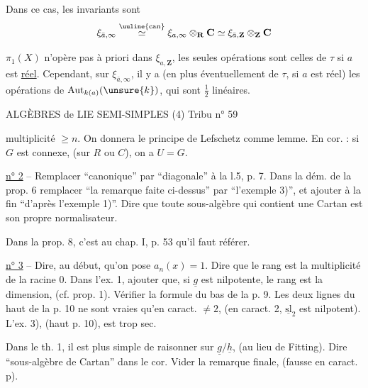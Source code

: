 Dans ce cas, les invariants sont
\[
\xi_{\bar a,\infty}\overset{\text{\uuline{can}}}{\simeq}\xi_{a,\infty}\otimes_{\mathbf R}\mathbf C\simeq\xi_{\bar a,\mathbf Z}\otimes_{\mathbf Z}\mathbf C
\]

$\pi_1(X)$ n'opère pas à priori dans $\xi_{a,\mathbf Z}$, les seules opérations sont celles de $\tau$ si $a$ est \uline{réel}. Cependant, sur $\xi_{\bar a,\infty}$, il y a (en plus éventuellement de $\tau$, si $a$ est réel) les opérations de $\operatorname{Aut}_{k(a)}(\unsure{k})$, qui sont $\frac12$ linéaires.


ALGÈBRES de LIE SEMI-SIMPLES (4) \hfill Tribu n° 59

multiplicité $\geq n$. On donnera le principe de Lefschetz comme lemme. En cor. : si $G$ est connexe, (sur $R$ ou $C$), on a $U=G$.

\uline{n° 2} -- Remplacer ``canonique'' par ``diagonale'' à la l.5, p. 7. Dans la dém. de la prop. 6 remplacer ``la remarque faite ci-dessus'' par ``l'exemple 3)'', et ajouter à la fin ``d'après l'exemple 1)''. Dire que toute sous-algèbre qui contient une Cartan est son propre normalisateur.

Dans la prop. 8, c'est au chap. I, p. 53 qu'il faut référer.

\uline{n° 3} -- Dire, au début, qu'on pose $a_n(x)=1$. Dire que le rang est la multiplicité de la racine 0. Dans l'ex. 1, ajouter que, si $\underline{g}$ est nilpotente, le rang est la dimension, (cf. prop. 1). Vérifier la formule du bas de la p. 9. Les deux lignes du haut de la p. 10 ne sont vraies qu'en caract. $\neq 2$, (en caract. 2, $\underline{\mathrm{sl}}_2$ est nilpotent). L'ex. 3), (haut p. 10), est trop sec.

Dans le th. 1, il est plus simple de raisonner sur $\underline{g}/\underline{h}$, (au lieu de Fitting). Dire ``sous-algèbre de Cartan'' dans le cor. Vider la remarque finale, (fausse en caract. p).

